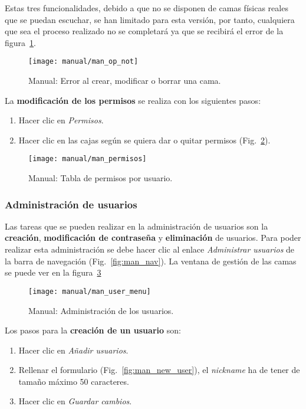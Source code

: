Estas tres funcionalidades, debido a que no se disponen de camas físicas reales que se puedan escuchar, se han limitado para esta versión, por tanto, cualquiera que sea el proceso realizado no se completará ya que se recibirá el error de la figura~\ref{fig:man_error_no_dis}.

\begin{figure}
	\centering
	\texttt{[image: manual/man\_op\_not]}
	\caption{Manual: Error al crear, modificar o borrar una cama.}
	\label{fig:man_error_no_dis}
\end{figure}

La \textbf{modificación de los permisos} se realiza con los siguientes pasos:
\begin{enumerate}
	\item Hacer clic en \textit{Permisos}.
	\item Hacer clic en las cajas según se quiera dar o quitar permisos (Fig.~\ref{fig:man_perm}).
\end{enumerate}

\begin{figure}
	\centering
	\texttt{[image: manual/man\_permisos]}
	\caption{Manual: Tabla de permisos por usuario.}
	\label{fig:man_perm}
\end{figure}

\subsubsection{Administración de usuarios}

Las tareas que se pueden realizar en la administración de usuarios son la \textbf{creación}, \textbf{modificación de contraseña} y \textbf{eliminación} de usuarios. Para poder realizar esta administración se debe hacer clic al enlace \textit{Administrar usuarios} de la barra de navegación (Fig.~\ref{fig:man_nav}). La ventana de gestión de las camas se puede ver en la figura~\ref{fig:man_menu_usuario}

\begin{figure}
	\centering
	\texttt{[image: manual/man\_user\_menu]}
	\caption{Manual: Administración de los usuarios.}
	\label{fig:man_menu_usuario}
\end{figure}

Los pasos para la \textbf{creación de un usuario} son:
\begin{enumerate}
	\item Hacer clic en \textit{Añadir usuarios}.
	\item Rellenar el formulario (Fig.~\ref{fig:man_new_user}), el \textit{nickname} ha de tener de tamaño máximo 50 caracteres.
	\item Hacer clic en \textit{Guardar cambios}.
\end{enumerate}

